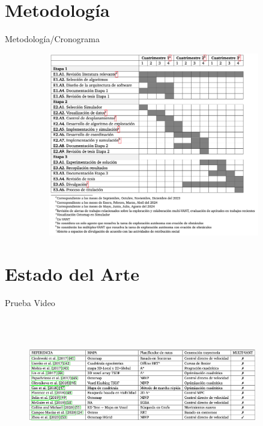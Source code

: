 \documentclass[
	12pt, %
	aspectratio=169, %
]{beamer}
\begin{document}
\section{Metodología}
\begin{frame}{Metodología/Cronograma}

  \begin{figure}
    \centering
    \includegraphics[width=11cm, height=8cm]{cronograma}
  \end{figure}
  
\end{frame}

\section{Estado del Arte}

\begin{frame}{Prueba Video}

  \centering
\end{frame}


\begin{frame}
\begin{figure}
  \centering
  \includegraphics[width=10cm, height=6cm]{estado_del_arte}
\end{figure}
\end{frame}
\end{document}
